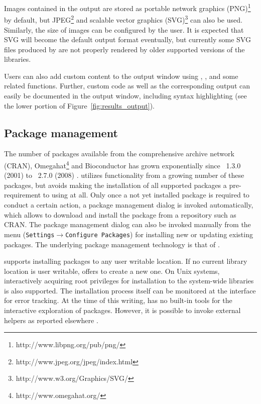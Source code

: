 Images contained in the output are stored as
portable network graphics (PNG)\footnote{http://www.libpng.org/pub/png/} by
default, but JPEG\footnote{http://www.jpeg.org/jpeg/index.html} and
scalable vector graphics (SVG)\footnote{http://www.w3.org/Graphics/SVG/}
can also be used. Similarly, the size of 
images can be configured by the user. It is expected that SVG will
become the default output format eventually, but currently some SVG
files produced by  are not properly
rendered by older supported versions of the
 libraries.

Users can also add custom content to the output window using , , and some
related functions. Further, custom  code as well as the corresponding  output can easily be documented in
the  output window, including syntax highlighting (see the lower portion of
Figure~\ref{fig:results_output}).

\subsection{Package management}
\label{sec:package_management}
The number of  packages available from the comprehensive  archive
network (CRAN), Omegahat\footnote{http://www.omegahat.org/} and Bioconductor \citep{Gentleman2004} has grown exponentially since \, 1.3.0
(2001) to \, 2.7.0 (2008) \citep{Fox2008, Ligges2003, Visne2009}. 
utilizes functionality from a growing number of these packages, but avoids
making the installation of all supported packages a pre-requirement to using
 at all. Only once a not yet installed package is required to conduct a certain
action, a package management dialog is invoked automatically, which allows to
download and install the package from a repository such as CRAN. The package
management dialog can also be invoked manually from the menu
(\texttt{Settings$\rightarrow$Configure Packages}) for installing new or updating existing 
packages. The underlying package management technology is that of 
\citep{Ligges2003, Ripley2005}.

 supports installing packages to any user writable location. If no current
library location is user writable,  offers to create a new one. 
On Unix systems, interactively acquiring root privileges for
installation to the system-wide libraries is also supported.
The installation process
itself can be monitored at the interface for error tracking. At the time of this writing,  has no
built-in tools for the interactive exploration of  packages. However, it is
possible to invoke external helpers as reported elsewhere \citep{Zhang2004}.

